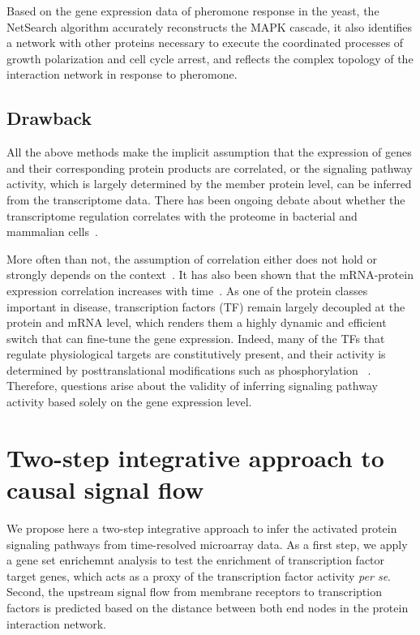 Based on the gene expression data of pheromone response in the yeast, the 
NetSearch algorithm accurately reconstructs the MAPK cascade, it also identifies a 
network with other proteins necessary to execute the coordinated processes of 
growth polarization and cell cycle arrest, and reflects the complex topology of 
the interaction network in response to pheromone.

\subsection{Drawback}
All the above methods make the implicit assumption that the expression of genes
and their corresponding protein products are correlated, or the signaling 
pathway activity, which is largely determined by the member protein level, 
can be inferred from the transcriptome data. There has been ongoing debate 
about whether the transcriptome regulation correlates with the proteome
in bacterial and mammalian cells~\citep{Taniguchi2010,Ghazalpour2011}. 

More
often than not, the assumption of correlation either does not hold or strongly depends on the context~\citep{Soufi2009}. 
It has also been shown that the mRNA-protein expression correlation increases 
with time~\citep{Fournier2010}.
As one of the protein classes important in disease, 
transcription factors (TF) remain largely decoupled at the 
protein
and mRNA level, which renders them a highly dynamic and efficient switch that 
can fine-tune the gene expression. Indeed, many of the TFs that regulate physiological
    targets are constitutively present, and their activity is determined
    by posttranslational modifications such as phosphorylation%
    ~\citep{Messina2004}.
Therefore, questions arise about the validity of inferring signaling 
pathway activity based solely on the gene expression level.

\section{Two-step integrative approach to causal signal flow}
We propose here a two-step integrative approach to infer the activated protein signaling
pathways from time-resolved microarray data. As a first step, we apply a
gene set enrichemnt analysis to test the
enrichment of transcription factor target genes, which acts as a proxy of
the transcription factor activity \emph{per se}. Second, the upstream 
signal flow from membrane receptors to transcription factors is predicted 
based on the distance between both end nodes in the protein interaction
network.

